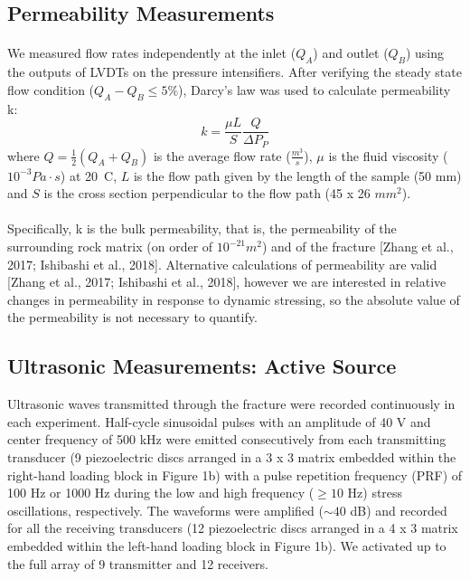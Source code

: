 \documentclass[letterpaper,10pt]{article}
\begin{document}
\subsection{Permeability Measurements}
\paragraph{} We measured flow rates independently at the inlet ($Q_A$) and outlet ($Q_B$) using the outputs of LVDTs on the pressure intensifiers. After verifying the steady state flow condition ($Q_{A} - Q_{B}  \leq 5 \% $), Darcy’s law was
used to calculate permeability k: 
\begin{equation} \label{eq:perm}
k = \frac{\mu L}{S} \frac{Q}{\Delta P_P}
\end{equation}
where $Q = \frac{1}{2} (Q_A + Q_B )$ is the average flow rate ($\frac{m^3}{s}$), $\mu$ is the fluid viscosity ($10^{-3} Pa\cdot s$) at 20\textdegree\ C, $L$ is the flow path given by the length of the sample (50 mm) and $S$ is the cross section perpendicular to the flow path (45 x 26 $mm^2$).
\paragraph{} Specifically, k is the bulk permeability, that is, the permeability of the surrounding rock matrix (on order of $10^{-21} m^2$) and of the fracture [Zhang et al., 2017; Ishibashi et al., 2018]. Alternative calculations of permeability are valid [Zhang et al., 2017; Ishibashi et al., 2018], however we are interested in relative changes in permeability in response to dynamic stressing, so the absolute value of the permeability is not necessary to quantify.


\subsection{Ultrasonic Measurements: Active Source}
Ultrasonic waves transmitted through the fracture were recorded continuously in each experiment. Half-cycle sinusoidal pulses with an amplitude of 40 V and center frequency of 500 kHz were emitted consecutively from each transmitting transducer (9 piezoelectric discs arranged in a 3 x 3 matrix embedded within the right-hand loading block in Figure 1b) with a pulse repetition frequency (PRF) of 100 Hz or 1000 Hz during the low and high frequency ($\geq 10$ Hz) stress oscillations, respectively. The waveforms were amplified ($\sim 40$ dB) and recorded for all the receiving transducers (12 piezoelectric discs arranged in a 4 x 3 matrix embedded within the left-hand loading block in Figure 1b). We activated up to the full array of 9 transmitter and 12 receivers. 
\end{document}
